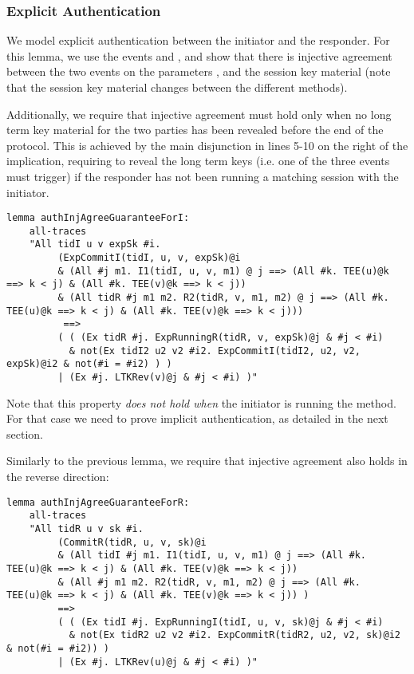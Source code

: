  
\subsubsection{Explicit Authentication}

We model explicit authentication between the initiator and the
responder.
%
For this lemma, we use the events  and
, and show that there is injective agreement
between the two events on the parameters ,
 and the session key material  (note
that the session key material changes between the different \mEdhoc{}
methods).

Additionally, we require that injective agreement must hold only when
no long term key material for the two parties has been revealed before
the end of the protocol.
%
This is achieved by the main disjunction in lines 5-10 on the right of
the implication, requiring to reveal the long term keys (i.e. one of
the three  events must trigger) if the responder has
not been running a matching session with the initiator.


\begin{lstlisting}
lemma authInjAgreeGuaranteeForI:
    all-traces
    "All tidI u v expSk #i.
         (ExpCommitI(tidI, u, v, expSk)@i
	     & (All #j m1. I1(tidI, u, v, m1) @ j ==> (All #k. TEE(u)@k ==> k < j) & (All #k. TEE(v)@k ==> k < j))
         & (All tidR #j m1 m2. R2(tidR, v, m1, m2) @ j ==> (All #k. TEE(u)@k ==> k < j) & (All #k. TEE(v)@k ==> k < j)))
          ==>
         ( ( (Ex tidR #j. ExpRunningR(tidR, v, expSk)@j & #j < #i)
           & not(Ex tidI2 u2 v2 #i2. ExpCommitI(tidI2, u2, v2, expSk)@i2 & not(#i = #i2) ) )
         | (Ex #j. LTKRev(v)@j & #j < #i) )"
\end{lstlisting}

Note that this property \emph{does not hold when} the initiator is
running the \mStat{} method.
%
For that case we need to prove implicit authentication, as detailed in
the next section.

Similarly to the previous lemma, we require that injective agreement also holds
in the reverse direction:

\begin{lstlisting}
lemma authInjAgreeGuaranteeForR:
    all-traces
    "All tidR u v sk #i.
         (CommitR(tidR, u, v, sk)@i
	     & (All tidI #j m1. I1(tidI, u, v, m1) @ j ==> (All #k. TEE(u)@k ==> k < j) & (All #k. TEE(v)@k ==> k < j))
         & (All #j m1 m2. R2(tidR, v, m1, m2) @ j ==> (All #k. TEE(u)@k ==> k < j) & (All #k. TEE(v)@k ==> k < j)) )
         ==>
         ( ( (Ex tidI #j. ExpRunningI(tidI, u, v, sk)@j & #j < #i)
           & not(Ex tidR2 u2 v2 #i2. ExpCommitR(tidR2, u2, v2, sk)@i2 & not(#i = #i2)) )
         | (Ex #j. LTKRev(u)@j & #j < #i) )"
\end{lstlisting}

